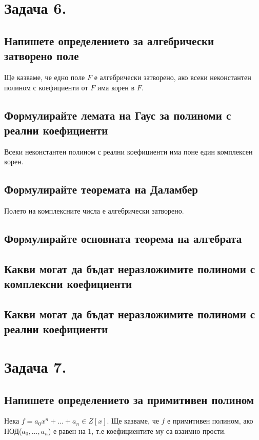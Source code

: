\documentclass[10pt]{article}
\begin{document}
\section*{Задача 6.}

\subsection*{Напишете определението за алгебрически затворено поле}
Ще казваме, че едно поле $F$ е алгебрически затворено, ако всеки неконстантен полином с коефициенти от $F$ има корен в $F$.

\subsection*{Формулирайте лемата на Гаус за полиноми с реални коефициенти}
Всеки неконстантен полином с реални коефициенти има поне един комплексен корен.

\subsection*{Формулирайте теоремата на Даламбер}
Полето на комплексните числа е алгебрически затворено.

\subsection*{Формулирайте основната теорема на алгебрата}

\subsection*{Какви могат да бъдат неразложимите полиноми с комплексни коефициенти}
\subsection*{Какви могат да бъдат неразложимите полиноми с реални коефициенти}


\section*{Задача 7.}

\subsection*{Напишете определението за примитивен полином}
Нека $f = a_0x^n + \ldots + a_n \in Z[x]$. Ще казваме, че $f$ е примитивен полином, ако НОД($a_0, \ldots, a_n$) е равен на $1$, т.е коефициентите му са взаимно прости.
\end{document}
